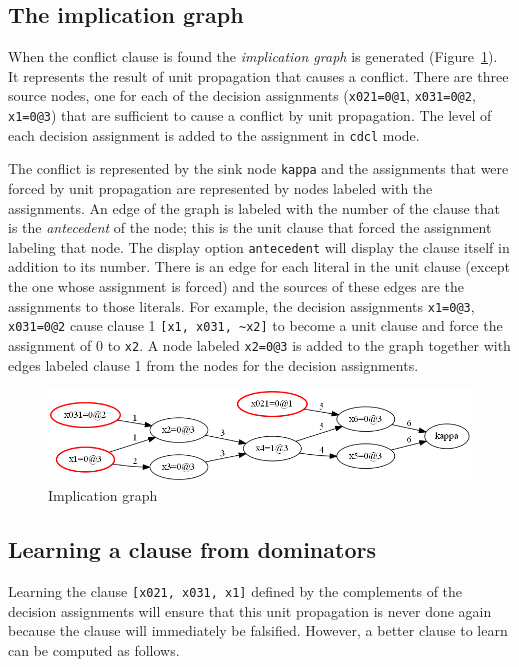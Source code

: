 \documentclass[11pt]{report}
\newcommand*{\p}[1]{\textup{\texttt{#1}}}
\begin{document}
\subsection{The implication graph}

When the conflict clause is found the \emph{implication graph} is
generated (Figure~\ref{fig.graph}). It represents the result of unit
propagation that causes a conflict. There are three source nodes, one
for each of the decision assignments (\p{x021=0@1}, \p{x031=0@2},
\p{x1=0@3}) that are sufficient to cause a conflict by unit propagation.
The level of each decision assignment is added to the assignment in
\p{cdcl} mode.

The conflict is represented by the sink node \p{kappa} and the
assignments that were forced by unit propagation are represented by
nodes labeled with the assignments. An edge of the graph is labeled with
the number of the clause that is the \emph{antecedent} of the node; this
is the unit clause that forced the assignment labeling that
node. The display option \p{antecedent} will display the clause
itself in addition to its number. There is an edge for each literal in
the unit clause (except the one whose assignment is forced) and the
sources of these edges are the assignments to those literals. For
example, the decision assignments \p{x1=0@3}, \p{x031=0@2}
cause clause 1 \verb+[x1, x031, ~x2]+ to become a unit clause
and force the assignment of 0 to \p{x2}. A node labeled \p{x2=0@3} is
added to the graph together with edges labeled clause 1 from the
nodes for the decision assignments.

\begin{figure}
\begin{center}
\includegraphics[keepaspectratio=true,width=\textwidth]{graph}
\end{center}
\caption{Implication graph}\label{fig.graph}
\end{figure}

\subsection{Learning a clause from dominators}

Learning the clause \p{[x021, x031, x1]} defined by the complements of
the decision assignments will ensure that this unit propagation is never
done again because the clause will immediately be falsified.
However, a better clause to learn can be computed as follows. 
\end{document}
